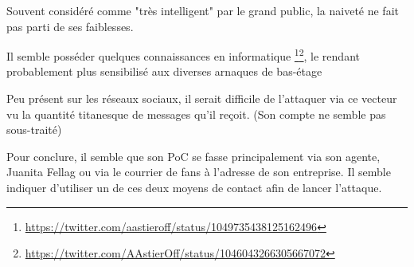 Souvent considéré comme "très intelligent" par le grand public, la naiveté ne fait pas parti de ses faiblesses.

Il semble posséder quelques connaissances en informatique \footnote{\url{https://twitter.com/aastieroff/status/1049735438125162496}}\footnote{\url{https://twitter.com/AAstierOff/status/1046043266305667072}}, le rendant probablement plus sensibilisé aux diverses arnaques de bas-étage

Peu présent sur les réseaux sociaux, il serait difficile de l'attaquer via ce vecteur vu la quantité titanesque de messages qu'il reçoit. (Son compte ne semble pas sous-traité)

Pour conclure, il semble que son PoC se fasse principalement via son agente, Juanita Fellag ou via le courrier de fans à l'adresse de son entreprise. Il semble indiquer d'utiliser un de ces deux moyens de contact afin de lancer l'attaque.

